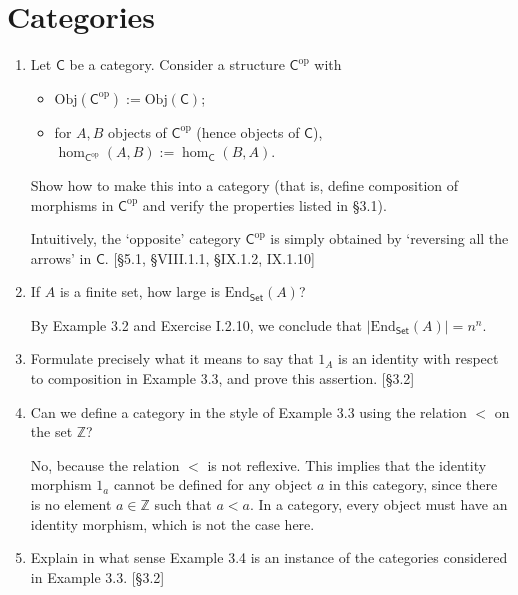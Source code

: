 \section{Categories}
\begin{enumerate}
    \item Let $\mathsf{C}$ be a category. Consider a structure $\mathsf{C}^{\mathrm{op}}$ with
          \begin{itemize}
              \item $\mathrm{Obj}(\mathsf{C}^{\mathrm{op}}) := \mathrm{Obj}(\mathsf{C})$;
              \item for $A, B$ objects of $\mathsf{C}^{\mathrm{op}}$ (hence objects of $\mathsf{C}$), $\hom_{\mathsf{C}^{\mathrm{op}}}(A, B) := \hom_{\mathsf{C}}(B, A)$.
          \end{itemize}
          Show how to make this into a category (that is, define composition of morphisms in $\mathsf{C}^{\mathrm{op}}$ and verify the properties listed in \S3.1).

          Intuitively, the `opposite' category $\mathsf{C}^{\mathrm{op}}$ is simply obtained by `reversing all the arrows' in $\mathsf{C}$. [\S5.1, \S VIII.1.1, \S IX.1.2, IX.1.10]

    \item If $A$ is a finite set, how large is $\mathrm{End}_{\mathsf{Set}}(A)$?
        \begin{solution}
            By Example 3.2 and Exercise I.2.10, we conclude that $|\mathrm{End}_{\mathsf{Set}}(A)|=n^n$.
        \end{solution}
    \item Formulate precisely what it means to say that $1_A$ is an identity with respect to composition in Example 3.3, and prove this assertion. [\S3.2]

    \item Can we define a category in the style of Example 3.3 using the relation $<$ on the set $\mathbb{Z}$?
    
    \begin{solution}
        No, because the relation $<$ is not reflexive. This implies that the identity morphism $1_a$ cannot be defined for any object $a$ in this category, since there is no element $a \in \mathbb{Z}$ such that $a < a$. In a category, every object must have an identity morphism, which is not the case here.
    \end{solution}

    \item Explain in what sense Example 3.4 is an instance of the categories considered in Example 3.3. [\S3.2]


\end{enumerate}
